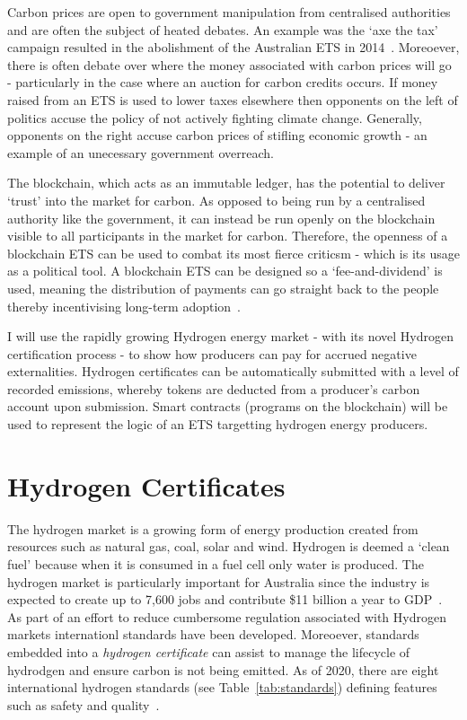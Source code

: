 Carbon prices are open to government manipulation from centralised
authorities and are often the subject of heated debates. An example
was the `axe the tax' campaign resulted in the abolishment of
the Australian ETS in 2014~\cite{EconE}. Moreoever, there is often
debate over where the money associated with carbon prices will go
- particularly in the case where an auction for carbon credits occurs.
If money raised from an ETS is used to lower taxes elsewhere then
opponents on the left of politics accuse the policy of not actively
fighting climate change. Generally, opponents on the right accuse carbon
prices of stifling economic growth - an example of an unecessary
government overreach.

The blockchain, which acts as an immutable ledger, has the potential to
deliver `trust' into the market for carbon. As opposed to being run
by a centralised authority like the government, it can instead be run
openly on the blockchain visible to all participants in the market for
carbon. Therefore, the openness of a blockchain ETS can be used to combat
its most fierce criticsm - which is its usage as a political tool.
A blockchain ETS can be designed so a `fee-and-dividend' is used, meaning
the distribution of payments can go straight back to the people thereby
incentivising long-term adoption~\cite{EconE}.

I will use the rapidly growing Hydrogen energy market - with its novel Hydrogen
certification process - to show how producers can pay for accrued
negative externalities. Hydrogen certificates can be automatically
submitted with a level of recorded emissions, whereby tokens are deducted
from a producer's carbon account upon submission. Smart contracts
(programs on the blockchain) will be used to represent the logic
of an ETS targetting hydrogen energy producers.

\section{Hydrogen Certificates}
The hydrogen market is a growing form of energy production created
from resources such as natural gas, coal, solar and wind. Hydrogen is
deemed a `clean fuel' because when it is consumed in a fuel cell
only water is produced. The hydrogen market is particularly important
for Australia since the industry is expected to create up to 7,600 jobs
and contribute \$11 billion a year to GDP~\cite{coag}. As part of an
effort to reduce cumbersome regulation associated with Hydrogen
markets internationl standards have been developed. Moreoever,
standards embedded into a \textit{hydrogen certificate} can
assist to manage the lifecycle of hydrodgen and ensure carbon
is not being emitted. As of 2020, there are eight international
hydrogen standards (see Table~\ref{tab:standards})
defining features such as safety and quality~\cite{stan}.

